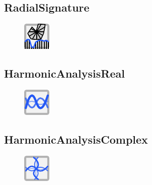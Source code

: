 \documentclass{ol-softwaremanual}
\begin{document}
\subsection{RadialSignature}
\begin{figure}[h]
    \centering
    \includegraphics[width = .5\textwidth]{figures/Icons/RADIALSIG.pdf}
\end{figure}

\subsection{HarmonicAnalysisReal}
\begin{figure}[h]
    \centering
    \includegraphics[width = .5\textwidth]{figures/Icons/HARMONICSREAL.pdf}
\end{figure}

\subsection{HarmonicAnalysisComplex}
\begin{figure}[h]
    \centering
    \includegraphics[width = .5\textwidth]{figures/Icons/HARMONICSCOMPLEX.pdf}
\end{figure}
\end{document}
